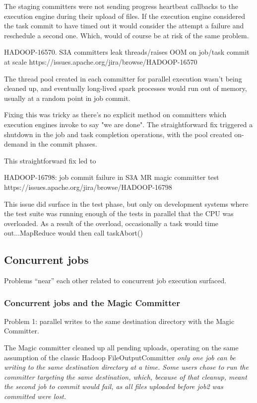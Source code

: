 \documentclass[format=acmsmall, screen=true, nonacm, timestamp, review=false]{acmart}
\begin{document}
The staging committers were not sending progress heartbeat callbacks
to the execution engine during their upload of files.
If the execution engine considered the task commit to have timed out
it would consider the attempt a failure and reschedule a second one.
Which, would of course be at risk of the same problem.


HADOOP-16570. S3A committers leak threads/raises OOM on job/task commit at scale
https://issues.apache.org/jira/browse/HADOOP-16570

The thread pool created in each committer for parallel execution wasn't being
cleaned up, and eventually long-lived spark processes would run out of memory,
usually at a random point in job commit.

Fixing this was tricky as there's no explicit method on committers which
execution engines invoke to say "we are done".
The straightforward fix triggered a shutdown in the job and task completion
operations, with the pool created on-demand in the commit phases.

This straightforward fix led to

HADOOP-16798: job commit failure in S3A MR magic committer test
https://issues.apache.org/jira/browse/HADOOP-16798

This issue did surface in the test phase, but only on development systems
where the test suite was running enough of the tests in parallel that the
CPU was overloaded. As a result of the overload, occasionally a task would
time out...MapReduce would then call taskAbort()

\subsection{Concurrent jobs}
\label{subsec:concurrent-jobs}

Problems ``near'' each other related to concurrent job execution surfaced.

\subsubsection{Concurrent jobs and the Magic Committer}

Problem 1: parallel writes to the same destination directory with the Magic Committer.

The Magic committer cleaned up all pending uploads,
operating on the same assumption of the classic Hadoop FileOutputCommitter
\em{only one job can be writing to the same destination directory at a time}.
Some users chose to run the committer targeting the same destination, which,
because of that cleanup, meant the second job to commit would fail, as all
files uploaded before job2 was committed were lost.
\end{document}
